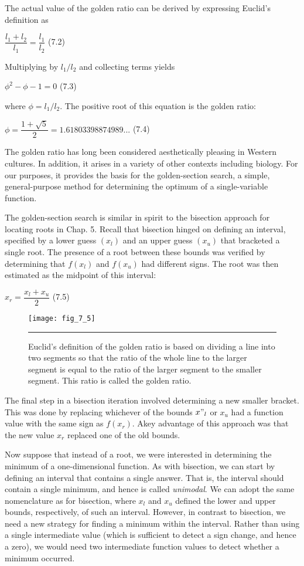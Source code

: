 \documentclass[../main.tex]{subfiles}
\begin{document}
The actual value of the golden ratio can be derived by expressing Euclid's definition as
\medskip

$\dfrac{l_1+l_2}{l_1}=\dfrac{l_1}{l_2}$ \hfill {(7.2)}
\medskip

\noindent Multiplying by $l_1/l_2$ and collecting terms yields
\medskip

$\phi^2-\phi-1=0$ \hfill {(7.3)}
\medskip

\noindent where $\phi=l_1/l_2$. The positive root of this equation is the golden ratio:

$\phi = \dfrac{1+\sqrt{5}}{2}=1.61803398874989...$ \hfill {(7.4)}
\medskip

The golden ratio has long been considered aesthetically pleasing in Western cultures.
In addition, it arises in a variety of other contexts including biology. For our purposes, it
provides the basis for the golden-section search, a simple, general-purpose method for determining
the optimum of a single-variable function.

The golden-section search is similar in spirit to the bisection approach for locating
roots in Chap. 5. Recall that bisection hinged on defining an interval, specified by a lower
guess $(x_l)$ and an upper guess $(x_u)$ that bracketed a single root. The presence of a root between
these bounds was verified by determining that $f(x_l)$ and $f(x_u)$ had different signs.
The root was then estimated as the midpoint of this interval:
\medskip

$x_r=\dfrac{x_l+x_u}{2}$ \hfill {(7.5)}
\medskip

\begin{figure}[H]
	\centering
	\texttt{[image: fig\_7\_5]}
	\caption{\textsf{Euclid's definition of the golden ratio is based on dividing a line into two segments so that the
	ratio of the whole line to the larger segment is equal to the ratio of the larger segment to the
	smaller segment. This ratio is called the golden ratio.}}
	\color{cyan} \rule{\linewidth}{0,5mm}
	\label{fig:fig_7_5}
\end{figure}

The final step in a bisection iteration involved determining a new smaller bracket. This was
done by replacing whichever of the bounds $x"_l$ or $x_u$ had a function value with the same sign
as $f(x_r)$. Akey advantage of this approach was that the new value $x_r$ replaced one of the old
bounds.

Now suppose that instead of a root, we were interested in determining the minimum of
a one-dimensional function. As with bisection, we can start by defining an interval that
contains a single answer. That is, the interval should contain a single minimum, and hence
is called \textit{unimodal}. We can adopt the same nomenclature as for bisection, where $x_l$ and $x_u$
defined the lower and upper bounds, respectively, of such an interval. However, in contrast
to bisection, we need a new strategy for finding a minimum within the interval. Rather than
using a single intermediate value (which is sufficient to detect a sign change, and hence a
zero), we would need two intermediate function values to detect whether a minimum
occurred.
\end{document}
